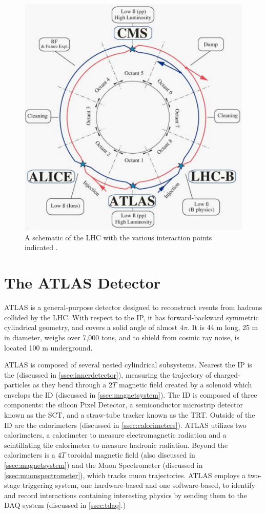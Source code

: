 \begin{figure}[!ht]
    \centering
    \includegraphics[width=.7\textwidth]{chapters/chapter2_experiment/images/lhc_interaction_points.png}
    \caption{A schematic of the LHC with the various interaction points indicated \cite{lhc}.}
    \label{fig:lhc}
\end{figure}


\section{The ATLAS Detector}

ATLAS \cite{atlas-experiment} is a general-purpose detector designed to reconstruct events from hadrons collided by the \gls{LHC}. With respect to the \gls{IP}, it has forward-backward symmetric cylindrical geometry, and covers a solid angle of almost $4\pi$. It is 44 m long, 25 m in diameter, weighs over 7,000 tons, and to shield from cosmic ray noise, is located 100 m underground. 

ATLAS is composed of several nested cylindrical subsystems. Nearest the \gls{IP} is the  (discussed in \ref{ssec:innerdetector}), measuring the trajectory of charged-particles as they bend through a $\unit{2}{T}$ magnetic field created by a solenoid which envelops the \gls{ID} (discussed in \ref{ssec:magnetsystem}). The \gls{ID} is composed of three components: the silicon Pixel Detector, a semiconductor microstrip detector known as the \gls{SCT}, and a straw-tube tracker known as the \gls{TRT}. Outside of the \gls{ID} are the calorimeters (discussed in \ref{ssec:calorimeters}). ATLAS utilizes two calorimeters, a  calorimeter to measure electromagnetic radiation and a scintillating tile calorimeter to measure hadronic radiation. Beyond the calorimeters is a $\unit{4}{T}$ toroidal magnetic field (also discussed in \ref{ssec:magnetsystem}) and the Muon Spectrometer (discussed in \ref{ssec:muonspectrometer}), which tracks muon trajectories. ATLAS employs a two-stage triggering system, one hardware-based and one software-based, to identify and record interactions containing interesting physics by sending them to the \gls{DAQ} system (discussed in \ref{ssec:tdaq}.)

